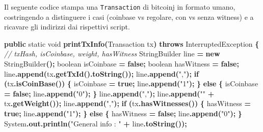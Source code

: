 \documentclass[
  italian,
  openany]{book}
\newenvironment{Shaded}{\begin{snugshade}}{\end{snugshade}}
\newcommand{\BuiltInTok}[1]{#1}
\newcommand{\CommentTok}[1]{\textcolor[rgb]{0.56,0.35,0.01}{\textit{#1}}}
\newcommand{\ControlFlowTok}[1]{\textcolor[rgb]{0.13,0.29,0.53}{\textbf{#1}}}
\newcommand{\DataTypeTok}[1]{\textcolor[rgb]{0.13,0.29,0.53}{#1}}
\newcommand{\FunctionTok}[1]{\textcolor[rgb]{0.13,0.29,0.53}{\textbf{#1}}}
\newcommand{\KeywordTok}[1]{\textcolor[rgb]{0.13,0.29,0.53}{\textbf{#1}}}
\newcommand{\NormalTok}[1]{#1}
\newcommand{\OperatorTok}[1]{\textcolor[rgb]{0.81,0.36,0.00}{\textbf{#1}}}
\newcommand{\StringTok}[1]{\textcolor[rgb]{0.31,0.60,0.02}{#1}}
\begin{document}
Il seguente codice stampa una \texttt{Transaction} di bitcoinj in
formato umano, costringendo a distinguere i casi (coinbase vs regolare,
con vs senza witness) e a ricavare gli indirizzi dai rispettivi script.

\begin{Shaded}
\begin{Highlighting}[]
\KeywordTok{public} \DataTypeTok{static} \DataTypeTok{void} \FunctionTok{printTxInfo}\OperatorTok{(}\NormalTok{Transaction tx}\OperatorTok{)} \KeywordTok{throws} \BuiltInTok{InterruptedException} \OperatorTok{\{}
    \CommentTok{// txHash, isCoinbase, weight, hasWitness}
    \BuiltInTok{StringBuilder}\NormalTok{ line }\OperatorTok{=} \KeywordTok{new} \BuiltInTok{StringBuilder}\OperatorTok{();}
    \DataTypeTok{boolean}\NormalTok{ isCoinbase }\OperatorTok{=} \KeywordTok{false}\OperatorTok{;}
    \DataTypeTok{boolean}\NormalTok{ hasWitness }\OperatorTok{=} \KeywordTok{false}\OperatorTok{;}
\NormalTok{    line}\OperatorTok{.}\FunctionTok{append}\OperatorTok{(}\NormalTok{tx}\OperatorTok{.}\FunctionTok{getTxId}\OperatorTok{().}\FunctionTok{toString}\OperatorTok{());}
\NormalTok{    line}\OperatorTok{.}\FunctionTok{append}\OperatorTok{(}\StringTok{","}\OperatorTok{);}
    \ControlFlowTok{if} \OperatorTok{(}\NormalTok{tx}\OperatorTok{.}\FunctionTok{isCoinBase}\OperatorTok{())} \OperatorTok{\{}
\NormalTok{        isCoinbase }\OperatorTok{=} \KeywordTok{true}\OperatorTok{;}
\NormalTok{        line}\OperatorTok{.}\FunctionTok{append}\OperatorTok{(}\StringTok{"1"}\OperatorTok{);}
    \OperatorTok{\}} \ControlFlowTok{else} \OperatorTok{\{}
\NormalTok{        isCoinbase }\OperatorTok{=} \KeywordTok{false}\OperatorTok{;}
\NormalTok{        line}\OperatorTok{.}\FunctionTok{append}\OperatorTok{(}\StringTok{"0"}\OperatorTok{);}
    \OperatorTok{\}}
\NormalTok{    line}\OperatorTok{.}\FunctionTok{append}\OperatorTok{(}\StringTok{","}\OperatorTok{);}
\NormalTok{    line}\OperatorTok{.}\FunctionTok{append}\OperatorTok{(}\StringTok{""} \OperatorTok{+}\NormalTok{ tx}\OperatorTok{.}\FunctionTok{getWeight}\OperatorTok{());}
\NormalTok{    line}\OperatorTok{.}\FunctionTok{append}\OperatorTok{(}\StringTok{","}\OperatorTok{);}
    \ControlFlowTok{if} \OperatorTok{(}\NormalTok{tx}\OperatorTok{.}\FunctionTok{hasWitnesses}\OperatorTok{())} \OperatorTok{\{}
\NormalTok{        hasWitness }\OperatorTok{=} \KeywordTok{true}\OperatorTok{;}
\NormalTok{        line}\OperatorTok{.}\FunctionTok{append}\OperatorTok{(}\StringTok{"1"}\OperatorTok{);}
    \OperatorTok{\}} \ControlFlowTok{else} \OperatorTok{\{}
\NormalTok{        hasWitness }\OperatorTok{=} \KeywordTok{false}\OperatorTok{;}
\NormalTok{        line}\OperatorTok{.}\FunctionTok{append}\OperatorTok{(}\StringTok{"0"}\OperatorTok{);}
    \OperatorTok{\}}
    \BuiltInTok{System}\OperatorTok{.}\FunctionTok{out}\OperatorTok{.}\FunctionTok{println}\OperatorTok{(}\StringTok{"General info : "} \OperatorTok{+}\NormalTok{ line}\OperatorTok{.}\FunctionTok{toString}\OperatorTok{());}


\end{Highlighting}
\end{Shaded}
\end{document}
